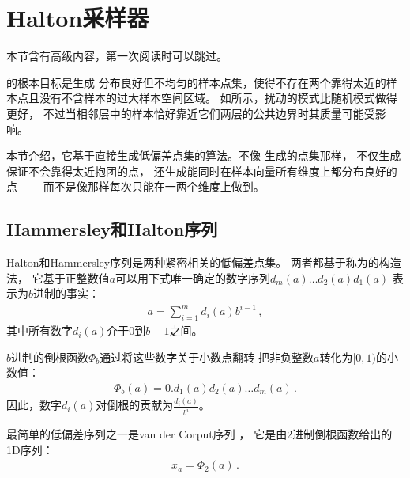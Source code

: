 \section{Halton采样器}\label{sec:Halton采样器}
\begin{remark}
    本节含有高级内容，第一次阅读时可以跳过。
\end{remark}

的根本目标是生成
分布良好但不均匀的样本点集，使得不存在两个靠得太近的样本点且没有不含样本的过大样本空间区域。
如所示，扰动的模式比随机模式做得更好，
不过当相邻层中的样本恰好靠近它们两层的公共边界时其质量可能受影响。

本节介绍，它基于直接生成低偏差点集的算法。不像\linebreak
{}生成的点集那样，
不仅生成保证不会靠得太近抱团的点，
还生成能同时在样本向量所有维度上都分布良好的点——
而不是像那样每次只能在一两个维度上做到。

\subsection{Hammersley和Halton序列}\label{sub:Hammersley和Halton序列}
Halton和Hammersley序列是两种紧密相关的低偏差点集。
两者都基于称为的构造法，
它基于正整数值$a$可以用下式唯一确定的数字序列$d_m(a)\ldots d_2(a)d_1(a)$
表示为$b$进制的事实：
\begin{align}
    \label{eq:7.6}
    a=\sum\limits_{i=1}^m{d_i(a)b^{i-1}}\, ,
\end{align}
其中所有数字$d_i(a)$介于0到$b-1$之间。

$b$进制的倒根函数$\varPhi_b$通过将这些数字关于小数点翻转
把非负整数$a$转化为$[0,1)$的小数值：
\begin{align}
    \label{eq:7.7}
    \varPhi_b(a)=0.d_1(a)d_2(a)\ldots d_m(a)\, .
\end{align}
因此，数字$d_i(a)$对倒根的贡献为$\displaystyle\frac{d_i(a)}{b^i}$。

最简单的低偏差序列之一是van der Corput序列
，
它是由2进制倒根函数给出的1D序列：
\begin{align*}
    x_a=\varPhi_2(a)\, .
\end{align*}

